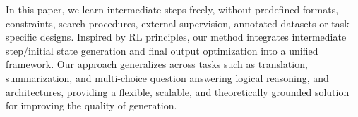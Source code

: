 In this paper, we learn intermediate steps freely, without predefined formats, constraints, search procedures, external supervision, annotated datasets or task-specific designs.
Inspired by RL principles, our method integrates intermediate step/initial state generation and final output optimization into a unified framework. 
Our approach generalizes across tasks such as translation, summarization, and multi-choice question answering logical reasoning, and architectures, providing a flexible, scalable, and theoretically grounded solution for improving the quality of generation.






